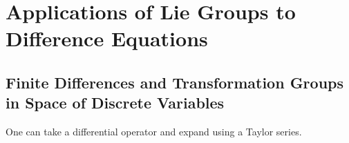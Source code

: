 \chapter{Applications of Lie Groups to Difference Equations}

\section{Finite Differences and Transformation Groups in Space of Discrete Variables}

One can take a differential operator and expand using a Taylor series.
